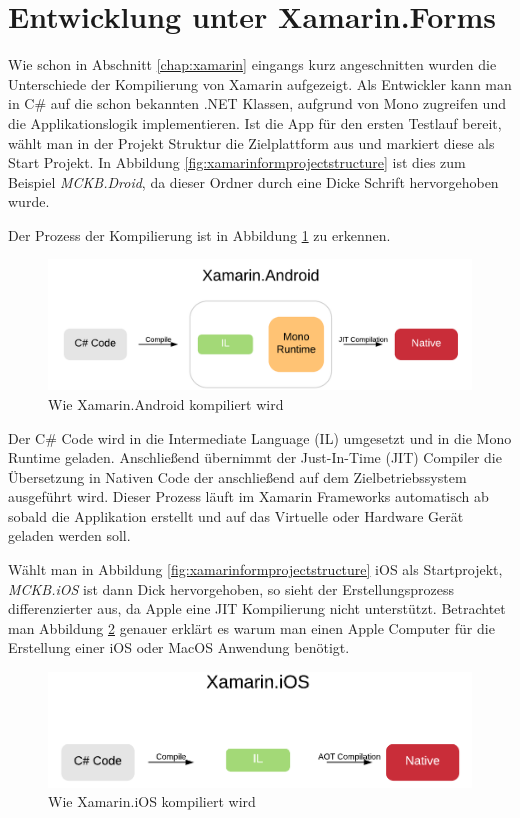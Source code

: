 \section{Entwicklung unter Xamarin.Forms}
\label{sec:xamarinformsdevelopement}

	Wie schon in Abschnitt \ref{chap:xamarin} eingangs kurz angeschnitten wurden die Unterschiede der Kompilierung von Xamarin aufgezeigt. Als Entwickler kann man in C\# auf die schon bekannten .NET Klassen, aufgrund von Mono zugreifen und die Applikationslogik implementieren. Ist die App für den ersten Testlauf bereit, wählt man in der Projekt Struktur die Zielplattform aus und markiert diese als Start Projekt. In Abbildung \ref{fig:xamarinformprojectstructure} ist dies zum Beispiel \textit{MCKB.Droid}, da dieser Ordner durch eine Dicke Schrift hervorgehoben wurde.

	Der Prozess der Kompilierung ist in Abbildung \ref{fig:xamarinanativeandroidcompile} zu erkennen.
	\begin{figure}[h!]
		\centering
		\includegraphics[width=1\textwidth]{images/Xamarin-Android.png}
		\caption{Wie Xamarin.Android kompiliert wird}
		\label{fig:xamarinanativeandroidcompile}
	\end{figure}

	Der C\# Code wird in die Intermediate Language (IL) umgesetzt und in die Mono Runtime geladen. Anschließend übernimmt der Just-In-Time (JIT) Compiler die Übersetzung in Nativen Code der anschließend auf dem Zielbetriebssystem ausgeführt wird. Dieser Prozess läuft im Xamarin Frameworks automatisch ab sobald die Applikation erstellt und auf das Virtuelle oder Hardware Gerät geladen werden soll.

	Wählt man in Abbildung \ref{fig:xamarinformprojectstructure} iOS als Startprojekt, \textit{MCKB.iOS} ist dann Dick hervorgehoben, so sieht der Erstellungsprozess differenzierter aus, da Apple eine JIT Kompilierung nicht unterstützt. Betrachtet man Abbildung \ref{fig:xamarinanativeioscompile} genauer erklärt es warum man einen Apple Computer für die Erstellung einer iOS oder MacOS Anwendung benötigt.
	\begin{figure}[h!]
		\centering
		\includegraphics[width=1\textwidth]{images/Xamarin-iOS.png}
		\caption{Wie Xamarin.iOS kompiliert wird}
		\label{fig:xamarinanativeioscompile}
	\end{figure}

